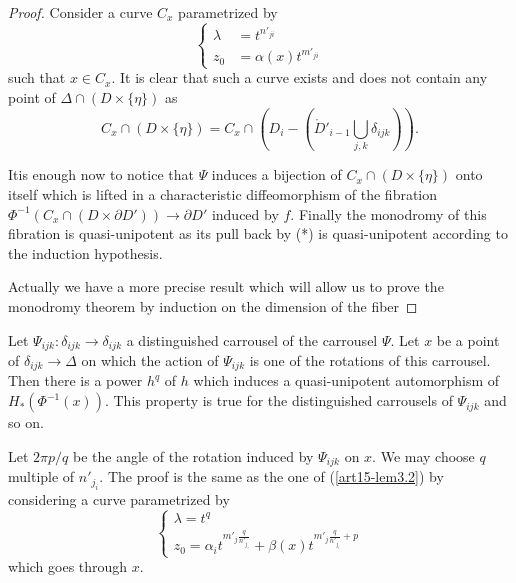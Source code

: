 \begin{proof}
Consider a curve $C_x$ parametrized by
\begin{equation*}
\left\{
\begin{aligned}
\lambda & = t^{n'_{ji}}\\
z_0 & = \alpha (x) t^{m'_{ji}}
\end{aligned}
\right. \tag{*}
\end{equation*}
such that $x \in C_x$. It is clear that such a curve exists and does not contain any point of $\Delta \cap (D \times \{\eta \})$ as
$$
C_x \cap ( D \times \{\eta\}) = C_x \cap (D_i - (\mathring{D}'_{i-1} \bigcup\limits_{j,k} \delta_{ijk})).
$$

It\pageoriginale is enough now to notice that $\Psi$ induces a bijection of $C_x \cap (D \times \{\eta\})$ onto itself which is lifted in a characteristic diffeomorphism of the fibration $\Phi^{-1} (C_x \cap (D \times \partial D')) \to \partial D'$  induced  by $f$. Finally the monodromy of this fibration is quasi-unipotent as its pull back by (*) is quasi-unipotent according to the induction hypothesis.

Actually we have a more precise result which will allow us to prove the monodromy theorem by induction on the dimension of the fiber
\end{proof}

\begin{lemma}\label{art15-lem3.3}
Let $\Psi_{ijk} :\delta_{ijk}\to \delta_{ijk}$ a distinguished carrousel of the carrousel $\Psi$. Let $x$ be a point of $\delta_{ijk} \to \Delta$ on which the action of $\Psi_{ijk}$ is one of the rotations of this carrousel. Then there is a power $h^q$ of $h$ which induces a quasi-unipotent automorphism of $H_* (\Phi^{-1} (x))$. This property is true for the distinguished carrousels of $\Psi_{ijk}$ and so on.
\end{lemma}

Let $2 \pi p/q$ be the angle of the rotation induced by $\Psi_{ijk}$ on $x$. We may choose $q$ multiple of $n'_{j_i}$. The proof is the same as the one of (\ref{art15-lem3.2}) by considering a curve parametrized by
\begin{equation*}
\begin{cases}
\lambda = t^q\\
z_0 = \alpha_i t^{m'_j \frac{q}{n'_{j_i}}} + \beta (x) t^{m'_j \frac{q}{n'_{j_i}} + p} 
\end{cases}
\end{equation*}
which goes through $x$.

